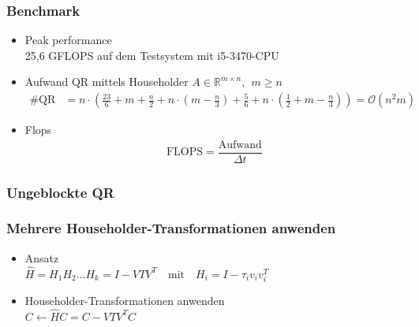 

\begin{frame}
\frametitle{Benchmark}
	\begin{itemize}
		\item Peak performance \\
		25,6 GFLOPS auf dem Testsystem mit i5-3470-CPU
		\item Aufwand QR mittels Householder $A \in \mathbb{R}^{m \times n},~~ m \ge n$
		\begin{align*}
			\#\text{QR} &= n\cdot\left( \frac{23}{6}+m+\frac{n}{2} + n\cdot\left(m-\frac{n}{3}\right) + \frac{5}{6} + n\cdot\left(\frac{1}{2} + m-\frac{n}{3}\right) \right) = \mathcal{O}(n^2m)
		\end{align*}
		\item Flops
		\begin{align*}
			\text{FLOPS} = \dfrac{\text{Aufwand}}{\Delta t}
		\end{align*}
	\end{itemize}
\end{frame}

\begin{frame}
	\frametitle{Ungeblockte QR}
	\centering
\end{frame}



\begin{frame}
	\frametitle{Mehrere Householder-Transformationen anwenden}	
	\vspace{-1cm}	
		\begin{itemize}
			\item Ansatz\\
			\vspace{0.3cm}
			$\hat{H} = H_1H_2...H_k = I - VTV^T \quad \text{mit}\quad H_i = I - \tau_i v_iv_i^T $
			\vspace{0.3cm}
			\item Householder-Transformationen anwenden\\
			\vspace{0.3cm}
			$ C \leftarrow \hat{H} C = C - V T V^T C \quad $
			
		\end{itemize}

		\vspace{-3cm}
		\hspace{9.5cm}
		\centering
		
\end{frame}

